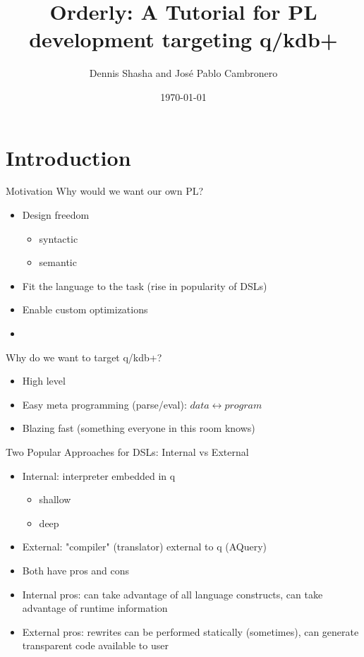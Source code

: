 \documentclass{beamer}
\title[orderly]{Orderly: A Tutorial for PL development targeting q/kdb+}
\author{Dennis Shasha and Jos\'e Pablo Cambronero}
\institute{Courant Institute/New York University}
\date{\today}
\let\todox\todo
\renewcommand\todo[1]{\todox[inline]{#1}}
\begin{document}
\begin{frame}
  \titlepage
\end{frame}

\section{Introduction}

\begin{frame}{Motivation}
Why would we want our own PL?
	\begin{itemize}
  		\item Design freedom
		    	\begin{itemize}
				\item syntactic
				\item semantic
			\end{itemize}
		\item Fit the language to the task (rise in popularity of DSLs)
		\item Enable custom optimizations
  		\item \todo{ more here }
	\end{itemize}
	
Why do we want to target q/kdb+?
	\begin{itemize}
		\item High level
		\item Easy meta programming (parse/eval): $data \leftrightarrow program$
		\item Blazing fast (something everyone in this room knows)
	\end{itemize}	
\end{frame}

\begin{frame}{Two Popular Approaches for DSLs: Internal vs External}
\begin{itemize}
	\item Internal: interpreter embedded in q
		\begin{itemize}
			\item shallow
			\item deep
		\end{itemize}
	\item External: "compiler" (translator) external to q (AQuery)
	\item Both have pros and cons
	\item Internal pros: can take advantage of all language constructs, can take advantage of runtime information
	\item External pros: rewrites can be performed statically (sometimes), can generate transparent code available to user
\end{itemize}
\end{frame}
\end{document}
